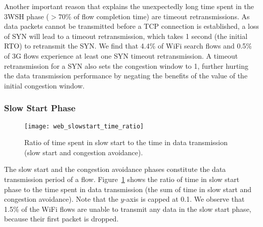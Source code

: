 

Another important reason that explains the unexpectedly long time spent in the 3WSH phase (\ie $>70\%$ of flow completion time) are timeout retransmissions. As data packets cannot be transmitted before a TCP connection is established, a loss of SYN will lead to a timeout retransmission, which takes 1 second (\ie the initial RTO) to retransmit the SYN. We find that 4.4\% of WiFi search flows and 0.5\% of 3G flows experience at least one SYN timeout retransmission. A timeout retransmission for a SYN also sets the congestion window to 1, further hurting the data transmission performance by negating the benefits of the value of the initial congestion window. 

\subsubsection{Slow Start Phase}

\begin{figure}[th]
\centering
\texttt{[image: web\_slowstart\_time\_ratio]}
\caption{Ratio of time spent in slow start to the time in data transmission (slow start and congestion avoidance).}
\label{fig:web_ss_time_ratio}
\minsqueeze
\end{figure}

The slow start and the congestion avoidance phases constitute the data transmission period of a flow. Figure~\ref{fig:web_ss_time_ratio} shows the ratio of time in slow start phase to the time spent in data transmission (\ie the sum of time in slow start and congestion avoidance). Note that the $y$-axis is capped at 0.1. We observe that 1.5\% of the WiFi flows are unable to transmit any data in the slow start phase, because their first packet is dropped.

